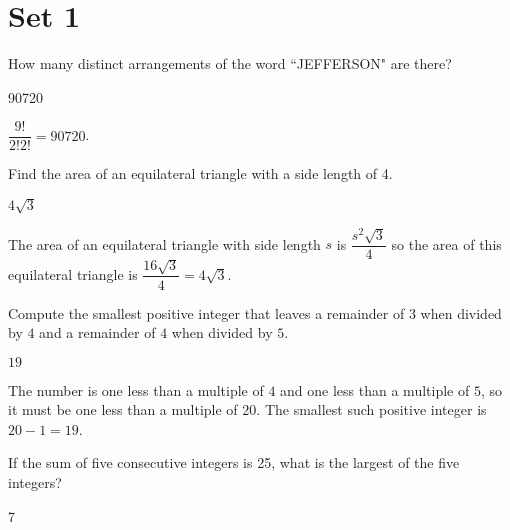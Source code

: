 \documentclass[11pt]{article}
\begin{document}
\section*{Set 1}

\begin{problem}%
How many distinct arrangements of the word ``JEFFERSON" are there?
\end{problem}

\begin{answer}
90720
\end{answer}

\begin{solution}	
$\dfrac{9!}{2!2!} = 90720$.
\end{solution}


\begin{problem}
Find the area of an equilateral triangle with a side length of 4.
\end{problem}

\begin{answer}
$4\sqrt{3}$
\end{answer}

\begin{solution}
The area of an equilateral triangle with side length $s$ is $\dfrac{s^2\sqrt{3}}{4}$ so the area of this equilateral triangle is $\dfrac{16\sqrt{3}}{4} = 4\sqrt{3}$.
\end{solution}


\begin{problem}
Compute the smallest positive integer that leaves a remainder of $3$ when divided by $4$ and a remainder of $4$ when divided by $5$.
\end{problem}

\begin{answer}
$19$
\end{answer}

\begin{solution}
The number is one less than a multiple of $4$ and one less than a multiple of $5$, so it must be one less than a multiple of $20$. The smallest such positive integer is $20 - 1 = 19$.
\end{solution}


\begin{problem}%
If the sum of five consecutive integers is 25, what is the largest of the five integers?
\end{problem}

\begin{answer}
7
\end{answer}
\end{document}
